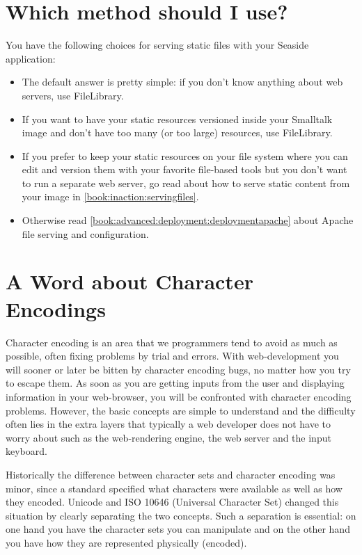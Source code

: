 \documentclass[a4paper,10pt,twoside]{book}
\newcommand{\ct}[1]{{\small\ttfamily\textup{#1}}}
\begin{document}
\section{Which method should I use?}
\label{book:inaction:servingfiles:whatmethod}

You have the following choices for serving static files with your Seaside application:

\begin{itemize}
\item  The default answer is pretty simple: if you don't know anything about web servers, use \ct{FileLibrary}. 
\item  If you want to have your static resources versioned inside your Smalltalk image and don't have too many (or too large) resources, use \ct{FileLibrary}. 
\item  If you prefer to keep your static resources on your file system where you can edit and version them with your favorite file-based tools but you don't want to run a separate web server, go read about how to serve static content from your image in \autoref{book:inaction:servingfiles}. 
\item  Otherwise read \autoref{book:advanced:deployment:deploymentapache} about Apache file serving and configuration.
\end{itemize}

\section{A Word about Character Encodings}
\label{book:inaction:servingfiles:characterencodings}

Character encoding is an area that we programmers tend to avoid as much as possible, often fixing problems by trial and errors. With web-development you will sooner or later be bitten by character encoding bugs, no matter how you try to escape them. As soon as you are getting inputs from the user and displaying information in your web-browser, you will be confronted with character encoding problems. However, the basic concepts are simple to understand and the difficulty often lies in the extra layers that typically a web developer does not have to worry about such as the web-rendering engine, the web server and the input keyboard. 

Historically the difference between character sets and character encoding was minor, since a standard specified what characters were available as well as how they encoded. Unicode and ISO 10646 (Universal Character Set) changed this situation by clearly separating the two concepts. Such a separation is essential: on one hand you have the character sets you can manipulate and on the other hand you have how they are represented physically (encoded).
\end{document}

